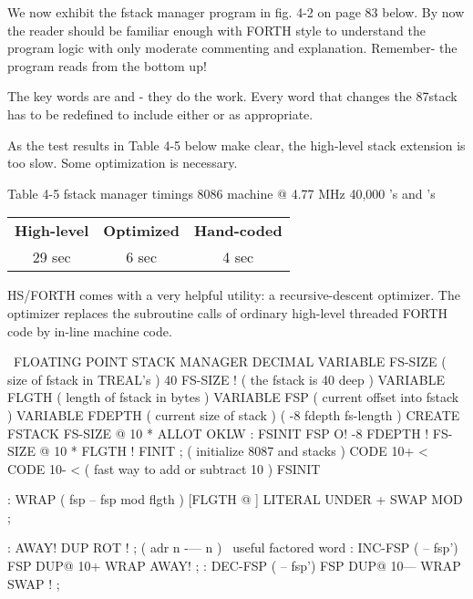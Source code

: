 {{{{{We now exhibit the fstack manager program in fig. 4-2 on page 83 below. By now the reader should be familiar enough with FORTH style to understand the program logic with only moderate commenting and explanation. Remember- the program reads from the bottom up!

The key words are  and - they do the work. Every word that changes the 87stack has to be redefined to include either  or  as appropriate.

As the test results in Table 4-5 below make clear, the high-level stack extension is too slow. Some optimization is necessary.

Table 4-5 fstack manager timings
8086 machine @ 4.77 MHz
40,000 's and 's
\begin{center}
    \begin{tabular}{|c c c|}
        \textbf{High-level} & \textbf{Optimized} & \textbf{Hand-coded} \\
        29 sec              & 6 sec              & 4 sec \\
    \end{tabular}
\end{center}

HS/FORTH comes with a very helpful utility: a recursive-descent optimizer. The optimizer replaces the subroutine calls of ordinary high-level threaded FORTH code by in-line machine code.

\begin{listing}
\ FLOATING POINT STACK MANAGER
DECIMAL
VARIABLE FS-SIZE                ( size of fstack in TREAL's  ) 
40 FS-SIZE !                    ( the fstack is 40 deep      )
VARIABLE FLGTH                  ( length of fstack in bytes  )
VARIABLE FSP                    ( current offset into fstack )
VARIABLE FDEPTH                 ( current size of stack      )
                                ( -8 fdepth fs-length        )
CREATE FSTACK FS-SIZE @ 10 * ALLOT OKLW
: FSINIT FSP O! -8 FDEPTH ! FS-SIZE @ 10 *
      FLGTH ! FINIT ;           ( initialize 8087 and stacks )
CODE 10+      <%
CODE 10-      <%
       ( fast way to add or subtract 10 )
FSINIT

: WRAP ( fsp -- fsp mod flgth ) 
       [FLGTH @ ] LITERAL UNDER + SWAP MOD ;

: AWAY! DUP ROT ! ; ( adr n -— n ) \ useful factored word
: INC-FSP ( -- fsp') FSP DUP@ 10+ WRAP AWAY!  ;
: DEC-FSP ( -- fsp') FSP DUP@ 10— WRAP SWAP ! ;


\end{listing}}}}}}
